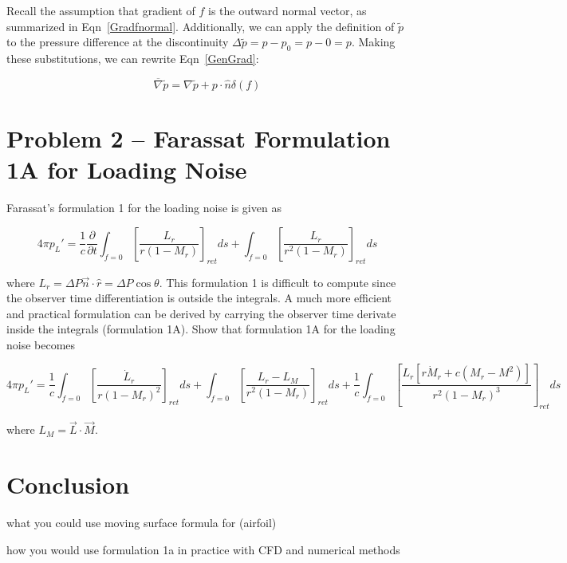 \documentclass[]{aiaa-tc}%
\begin{document}
Recall the assumption that gradient of $f$ is the outward normal vector, as summarized in Eqn~\ref{Gradfnormal}.  Additionally, we can apply the definition of $\widetilde{p}$ to the pressure difference at the discontinuity $\Delta\widetilde{p} = p - p_0 = p - 0 = p$.  Making these substitutions, we can rewrite Eqn~\ref{GenGrad}:

\begin{equation} \label{GenGradAssume}
\overline{\nabla} \widetilde{p}
= \nabla\widetilde{p} + p \cdot \hat{n} \delta(f)
\end{equation}





\section{Problem 2 -- Farassat Formulation 1A for Loading Noise} \label{SecFarassat}


Farassat’s formulation 1 for the loading noise is given as

\begin{equation} \label{FarassatForm1Loading}
4\pi p_{L}' = \dfrac{1}{c} \dfrac{\partial}{\partial t}
      \int_{f=0} \left[ \dfrac{L_r}{r   (1 - M_r)} \right]_{ret} ds
    + \int_{f=0} \left[ \dfrac{L_r}{r^2 (1 - M_r)} \right]_{ret} ds
\end{equation}


\noindent where $L_r = \Delta P \vec{n} \cdot \hat{r} = \Delta P \cos\theta$. This formulation 1 is difficult to compute since the observer time differentiation is outside the integrals. A much more efficient and practical formulation can be derived by carrying the observer time derivate inside the integrals (formulation 1A). Show that formulation 1A for the loading noise becomes

\begin{equation} \label{FarassatForm1ALoadingEx}
4\pi p_{L}' = \dfrac{1}{c}
      \int_{f=0} \left[ \dfrac{\dot{L}_r}{r (1 - M_r)^2} \right]_{ret} ds
    + \int_{f=0} \left[ \dfrac{L_r - L_M}{r^2 (1 - M_r)} \right]_{ret} ds
+ \dfrac{1}{c} \int_{f=0} \left[
    \dfrac{ L_r[r \dot{M}_r + c(M_r - M^2)] }{r^2 (1 - M_r)^3} \right]_{ret} ds
\end{equation}

\noindent where $L_M = \vec{L} \cdot \vec{M} $.




\section*{Conclusion}

what you could use moving surface formula for (airfoil)

how you would use formulation 1a in practice with CFD and numerical methods
\end{document}
